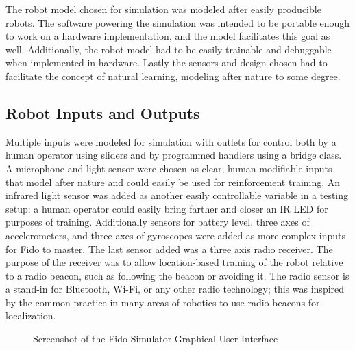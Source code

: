 The robot model chosen for simulation was modeled after easily producible robots.  The software powering the simulation was intended to be portable enough to work on a hardware implementation, and the model facilitates this goal as well.  Additionally, the robot model had to be easily trainable and debuggable when implemented in hardware.   Lastly the sensors and design chosen had to facilitate the concept of natural learning, modeling after nature to some degree.

\subsection{Robot Inputs and Outputs}

Multiple inputs were modeled for simulation with outlets for control both by a human operator using sliders and by programmed handlers using a bridge class.  A microphone and light sensor were chosen as clear, human modifiable inputs that model after nature and could easily be used for reinforcement training.  An infrared light sensor was added as another easily controllable variable in a testing setup: a human operator could easily bring farther and closer an IR LED for purposes of training.   Additionally sensors for battery level, three axes of accelerometers, and three axes of gyroscopes were added as more complex inputs for Fido to master.  The last sensor added was a three axis radio receiver.  The purpose of the receiver was to allow location-based training of the robot relative to a radio beacon, such as following the beacon or avoiding it.  The radio sensor is a stand-in for Bluetooth, Wi-Fi, or any other radio technology; this was inspired by the common practice in many areas of robotics to use radio beacons for localization.

\begin{figure}
	\centering
	\caption{Screenshot of the Fido Simulator Graphical User Interface}
\end{figure}

